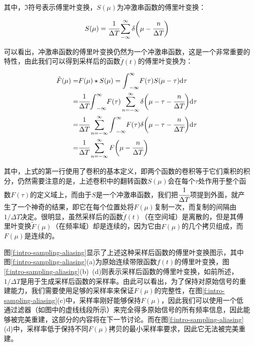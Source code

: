 \noindent 其中，$\Im$符号表示傅里叶变换，$S(\mu)$为冲激串函数的傅里叶变换：

\begin{equation}
	S(\mu)=\cfrac{1}{\Delta T}\sum^{\infty}_{-\infty}\delta\bigg(\mu -\cfrac{n}{\Delta T}\bigg)
\end{equation}

可以看出，冲激串函数的傅里叶变换仍然为一个冲激串函数，这是一个非常重要的特性，由此我们可以得到采样后的函数$\tilde{f}(t)$的傅里叶变换为：

\begin{equation}\label{e:intro-temp1}
\begin{aligned}
	\tilde{F}(\mu)=&F(\mu)\star S(\mu)={\rm \int}^{\infty}_{-\infty}F(\tau)S(\mu-\tau){\rm d}\tau\\
	=&\cfrac{1}{\Delta T}{\rm \int}^{\infty}_{-\infty}F(\tau)\sum^{\infty}_{n=-\infty}\delta\bigg(\mu-\tau-\cfrac{n}{\Delta T}\bigg){\rm d}\tau\\
	=&\cfrac{1}{\Delta T}\sum^{\infty}_{n=-\infty}{\rm \int}^{\infty}_{-\infty}F(\tau)\delta\bigg(\mu-\tau-\cfrac{n}{\Delta T}\bigg){\rm d}\tau\\
	=&\cfrac{1}{\Delta T}\sum^{\infty}_{n=-\infty}F\bigg(\mu-\cfrac{n}{\Delta T}\bigg)
\end{aligned}
\end{equation}

\noindent 其中，上式的第一行使用了卷积的基本定义，即两个函数的卷积等于它们乘积的积分，仍然需要注意的是，上述卷积中的翻转函数$S(\mu)$会在每个$\tau$处作用于整个函数$F(\tau)$的定义域上，而由于$S$是一个冲激串函数，我们把$\cfrac{1}{\Delta T}$项提到外面，就产生了一个神奇的结果，即它在每个位置处将$F(\mu)$复制一次，而复制的间隔由$1/\Delta T$决定。很明显，虽然采样后的函数$\tilde{f}(t)$（在空间域）是离散的，但是其傅里叶变换$\tilde{F}(\mu)$（在频率域）却是连续的，因为它由$F(\mu)$的几个拷贝组成，而$F(\mu)$是连续的。

图\ref{f:intro-sampling-aliasing}显示了上述这种采样后函数的傅里叶变换图示，其中图\ref{f:intro-sampling-aliasing}(a)为原始连续带限函数$f(t)$的傅里叶变换，图\ref{f:intro-sampling-aliasing}(b)~(d)则表示采样后函数的傅里叶变换，如前所述，$1/\Delta T$是用于生成采样后函数的采样率。由此可以看出，为了保持对原始信号的重建能力，我们需要使用足够的采样率来保证$F(\mu)$的完整性，在图\ref{f:intro-sampling-aliasing}(c)中，采样率刚好能够保持$F(\mu)$，因此我们可以使用一个低通过滤器（如图中的虚线线段所示）来完全得多原始信号的所有频率信息，因此能够被完美重建，这部分的内容将在下一节讨论。而在图\ref{f:intro-sampling-aliasing}(d)中，采样率低于保持不同$F(\mu)$拷贝的最小采样率要求，因此它无法被完美重建。

